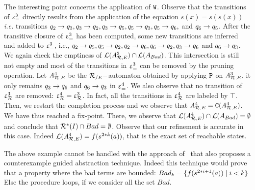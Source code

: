 The interesting point concerns the application of $\mathtt{W}$.  Observe
that the transitions of $\upvarepsilon_{=}^3$ directly results from the application
of the equation $s(x) = s(s(x))$ {\em i.e.} transitions $q_2\rightarrow q_3,
q_3\rightarrow q_2, q_3\rightarrow q_5,q_5\rightarrow q_3, q_5\rightarrow q_6,$ and $q_6\rightarrow q_5$.  After
the transitive closure of $\upvarepsilon_{=}^3$ has been computed, some new
transitions are inferred and added to $\upvarepsilon_{=}^3$, i.e., $q_2\rightarrow q_5,q_5\rightarrow
q_2, q_2\rightarrow q_6, q_6\rightarrow q_2, q_3\rightarrow q_6$ and $q_6\rightarrow q_3$.  We again check
the emptiness of $\mathcal{L}({\it A}_{\mathcal R,E}^3) \cap \mathcal{L}(A_{Bad})$.  This
intersection is still not empty and most of the transitions in
$\upvarepsilon_{=}^3$ can be removed by the pruning operation.  Let ${\it A}_{\mathcal R,E}^4$ be
the ${\mathcal R_{/E}}-$automaton obtained by applying $\mathtt{P}$ on ${\it A}_{\mathcal R,E}^3$, it
only remains $ q_3\rightarrow q_6$ and $q_6\rightarrow q_3$ in $\upvarepsilon_{=}^4$. We also observe
that no transition of $\upvarepsilon_{\mathcal R}^3$ are removed: $\upvarepsilon_{\mathcal R}^4=\upvarepsilon_{\mathcal R}^3$. In fact,
all the transitions in $\upvarepsilon_{\mathcal R}^4$ are labeled by $\top$. Then, we
restart the completion process and we observe that
${\it A}_{\mathcal R,E}^4=\mathtt{C}({\it A}_{\mathcal R,E}^4)$.  We have thus reached a
fix-point. There, we observe that $\mathcal{L}({\it A}_{\mathcal R,E}^4)\cap
\mathcal{L}(A_{Bad})=\emptyset$ and conclude that $\mathcal R^*(I) \cap Bad
=\emptyset$. Observe that our refinement is accurate in this
case. Indeed $\mathcal{L}({\it A}_{\mathcal R,E}^4)=f(s^{2*k}(a))$, that is the exact set
of reachable states.

\begin{remark}
The above example cannot be handled with
the approach of~\cite{BCHK08} that also proposes a counterexample
guided abstraction technique. Indeed this technique would prove that a
property where the bad terms are bounded: $Bad_k = \{ f(s^{2*i +1}(a))
\; | \; i < k\}$ Else the procedure loops, if we consider all the set
$Bad$.
\end{remark}


